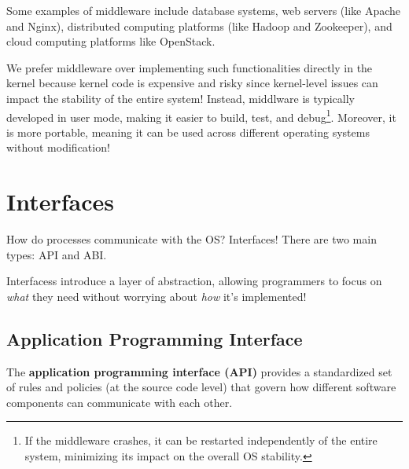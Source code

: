\documentclass{report}
\begin{document}
\begin{tcolorbox}[colback=blue!5!white,colframe=black!75!blue,title=Example: Middleware Madness] 
  Some examples of middleware include database systems, web servers (like Apache and Nginx),
  distributed computing platforms (like Hadoop and Zookeeper), and cloud computing platforms like
  OpenStack.
\end{tcolorbox}

We prefer middleware over implementing such functionalities directly in the kernel because kernel
code is expensive and risky since kernel-level issues can impact the stability of the entire system!
Instead, middlware is typically developed in user mode, making it easier to build, test, and
debug\footnote{If the middleware crashes, it can be restarted independently of the entire system,
  minimizing its impact on the overall OS stability.}. Moreover, it is more portable, meaning it can
be used across different operating systems without modification!










\chapter{Interfaces}
How do processes communicate with the OS? Interfaces! There are two main types: API and ABI.

\begin{tcolorbox}[colback=violet!5!white,colframe=violet,title=Abstraction: Interfaces] 
  Interfacess introduce a layer of abstraction, allowing programmers to focus on \textit{what} they need
  without worrying about \textit{how} it's implemented! 
\end{tcolorbox}





\section{Application Programming Interface}
\begin{tcolorbox}[title=Definition: Application Programming Interface]
  The \textbf{application programming interface (API)} provides a standardized set of rules and
  policies (at the source code level) that govern how different software components can communicate
  with each other.
\end{tcolorbox}
\end{document}
